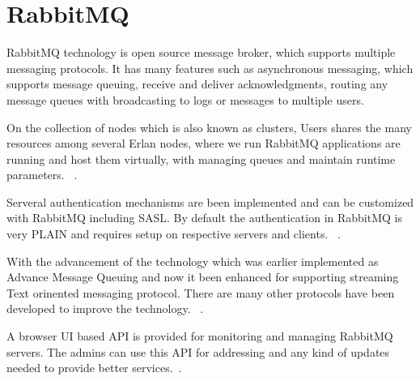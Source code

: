 \section{RabbitMQ}

RabbitMQ technology is open source message broker, which supports multiple
messaging protocols. It has many features such as asynchronous messaging,
which supports message queuing, receive and deliver acknowledgments, routing
any message queues with broadcasting to logs or messages to multiple users.

On the collection of nodes which is also known as clusters, Users shares the 
many resources among several Erlan nodes, where we run RabbitMQ applications 
are running and host them virtually, with managing queues and maintain 
runtime parameters. ~\cite{hid-sp18-520-RabbitMQCluster}.

Serveral authentication mechanisms are been implemented and can be customized
with RabbitMQ including SASL. By default the authentication in RabbitMQ is
very PLAIN and requires setup on respective servers and clients.
~\cite{hid-sp18-520-RabbitMQauth}.

With the advancement of the technology which was earlier implemented as
Advance Message Queuing and now it been enhanced for supporting
streaming Text orinented messaging protocol. There are many other protocols
have been developed to improve the technology.
~\cite{hid-sp18-520-RabbitMQwiki}.

A browser UI based API is provided for monitoring and managing RabbitMQ
servers. The admins can use this API for addressing and any kind of updates 
needed to provide better services.~\cite{hid-sp18-520-RabbitMQmana}.
